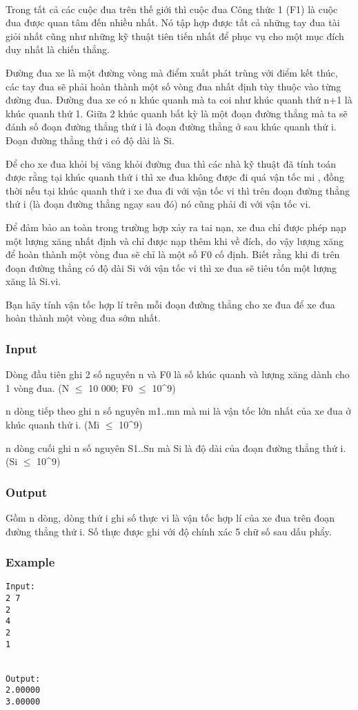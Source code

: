 

 

Trong tất cả các cuộc đua trên thế giới thì cuộc đua Công thức 1 (F1) là cuộc đua được quan tâm đến nhiều nhất. Nó tập hợp được tất cả những tay đua tài giỏi nhất cũng như những kỹ thuật tiên tiến nhất để phục vụ cho một mục đích duy nhất là chiến thắng.

Đường đua xe là một đường vòng mà điểm xuất phát trùng với điểm kết thúc, các tay đua sẽ phải hoàn thành một số vòng đua nhất định tùy thuộc vào từng đường đua. Đường đua xe có n khúc quanh mà ta coi như khúc quanh thứ n+1 là khúc quanh thứ 1. Giữa 2 khúc quanh bất kỳ là một đoạn đường thẳng mà ta sẽ đánh số đoạn đường thẳng thứ i là đoạn đường thẳng ở sau khúc quanh thứ i. Đoạn đường thẳng thứ i có độ dài là Si.

Để cho xe đua khỏi bị văng khỏi đường đua thì các nhà kỹ thuật đã tính toán được rằng tại khúc quanh thứ i thì xe đua không được đi quá vận tốc mi , đồng thời nếu tại khúc quanh thứ i xe đua đi với vận tốc vi thì trên đoạn đường thẳng thứ i (là đoạn đường thẳng ngay sau đó) nó cũng phải đi với vận tốc vi.

Để đảm bảo an toàn trong trường hợp xảy ra tai nạn, xe đua chỉ được phép nạp một lượng xăng nhất định và chỉ được nạp thêm khi về đích, do vậy lượng xăng để hoàn thành một vòng đua sẽ chỉ là một số F0 cố định. Biết rằng khi đi trên đoạn đường thẳng có độ dài Si với vận tốc vi thì xe đua sẽ tiêu tốn một lượng xăng là Si.vi.

Bạn hãy tính vận tốc hợp lí trên mỗi đoạn đường thẳng cho xe đua để xe đua hoàn thành một vòng đua sớm nhất.

\subsubsection{Input}

Dòng đầu tiên ghi 2 số nguyên n và F0 là số khúc quanh và lượng xăng dành cho 1 vòng đua. (N $\le$ 10 000; F0 $\le$ 10\textasciicircum9)

n dòng tiếp theo ghi n số nguyên m1..mn mà mi là vận tốc lớn nhất của xe đua ở khúc quanh thứ i. (Mi $\le$ 10\textasciicircum9)

n dòng cuối ghi n số nguyên S1..Sn mà Si là độ dài của đoạn đường thẳng thứ i. (Si $\le$ 10\textasciicircum9)

\subsubsection{Output}

Gồm n dòng, dòng thứ i ghi số thực vi là vận tốc hợp lí của xe đua trên đoạn đường thẳng thứ i. Số thực được ghi với độ chính xác 5 chữ số sau dấu phẩy.

\subsubsection{Example}
\begin{verbatim}
Input:
2 7
2 
4 
2
1


Output:
2.00000
3.00000
\end{verbatim}
